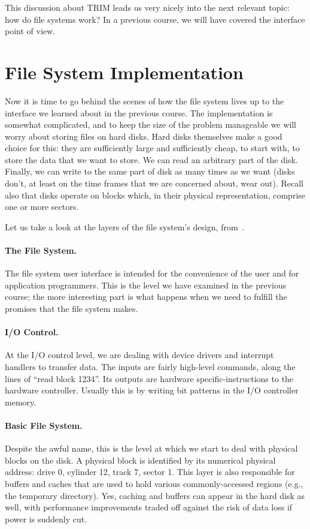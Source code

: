 This discussion about TRIM leads us very nicely into the next relevant topic: how do file systems work? In a previous course, we will have covered the interface point of view. 

\section*{File System Implementation}
Now it is time to go behind the scenes of how the file system lives up to the interface we learned about in the previous course. The implementation is somewhat complicated, and to keep the size of the problem manageable we will worry about storing files on hard disks. Hard disks themselves make a good choice for this: they are sufficiently large and sufficiently cheap, to start with, to store the data that we want to store. We can read an arbitrary part of the disk. Finally, we can write to the same part of disk as many times as we want (disks don't, at least on the time frames that we are concerned about, wear out). Recall also that disks operate on blocks which, in their physical representation, comprise one or more sectors.

Let us take a look at the layers of the file system's design, from~\cite{osc}.

\paragraph{The File System.} The file system user interface is intended for the convenience of the user and for application programmers. This is the level we have examined in the previous course; the more interesting part is what happens when we need to fulfill the promises that the file system makes.

\paragraph{I/O Control.} At the I/O control level, we are dealing with device drivers and interrupt handlers to transfer data. The inputs are fairly high-level commands, along the lines of ``read block 1234''. Its outputs are hardware specific-instructions to the hardware controller. Usually this is by writing bit patterns in the I/O controller memory.

\paragraph{Basic File System.} Despite the awful name, this is the level at which we start to deal with physical blocks on the disk. A physical block is identified by its numerical physical address: drive 0, cylinder 12, track 7, sector 1. This layer is also responsible for buffers and caches that are used to hold various commonly-accessed regions (e.g., the temporary directory). Yes, caching and buffers can appear in the hard disk as well, with performance improvements traded off against the risk of data loss if power is suddenly cut.

